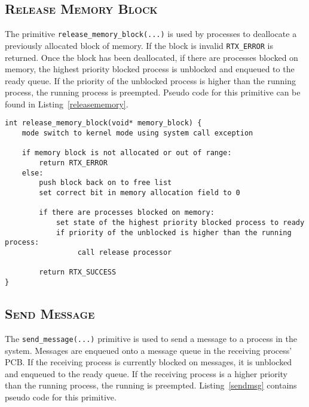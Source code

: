 \documentclass[oneside]{report}
\begin{document}
\subsection{\textsc{Release Memory Block}}

The primitive \texttt{release\_memory\_block(...)} is used by processes to
deallocate a previously allocated block of memory. If the block is invalid
\texttt{RTX\_ERROR} is returned. Once the block has been deallocated, if there
are processes blocked on memory, the highest priority blocked process is
unblocked and enqueued to the ready queue. If the priority of the unblocked
process is higher than the running process, the running process is preempted.
Pseudo code for this primitive can be found in Listing~\ref{releasememory}.

\begin{lstlisting}
int release_memory_block(void* memory_block) {
    mode switch to kernel mode using system call exception

    if memory block is not allocated or out of range:
        return RTX_ERROR
    else:
        push block back on to free list
        set correct bit in memory allocation field to 0

        if there are processes blocked on memory:
            set state of the highest priority blocked process to ready
            if priority of the unblocked is higher than the running process:
                 call release processor

        return RTX_SUCCESS        
}
\end{lstlisting}

\subsection{\textsc{Send Message}}

The \texttt{send\_message(...)} primitive is used to send a message to a
process in the system. Messages are enqueued onto a message queue in
the receiving process' PCB. If the receiving process is currently
blocked on messages, it is unblocked and enqueued to the ready
queue. If the receiving process is a higher priority than the running
process, the running is preempted. Listing~\ref{sendmsg} contains
pseudo code for this primitive.
\end{document}
